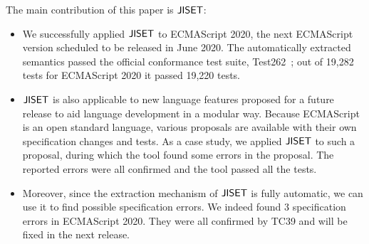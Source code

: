 The main contribution of this paper is \( \text{\sf JISET} \):
\begin{itemize}[leftmargin=0.5cm]
\item We successfully applied \( \text{\sf JISET} \) to ECMAScript 2020, the next
ECMAScript version scheduled to be released in June 2020.  The
automatically extracted semantics passed the official conformance test
suite, Test262~\cite{test262}; out of 19,282 tests for
ECMAScript 2020 it passed 19,220 tests.
\item \( \text{\sf JISET} \) is also applicable to new language features proposed
for a future release to aid language development in a modular way.
Because ECMAScript is an open standard language, various proposals are
available with their own specification changes and tests.  As a case
study, we applied \( \text{\sf JISET} \) to such a proposal, during which the tool
found some errors in the proposal.  The reported errors were all confirmed
and the tool passed all the tests.
\item Moreover, since the extraction mechanism of \( \text{\sf JISET} \) is fully
automatic, we can use it to find possible specification errors.  We
indeed found 3 specification errors in ECMAScript 2020.  They were all
confirmed by TC39 and will be fixed in the next release.
\end{itemize}
